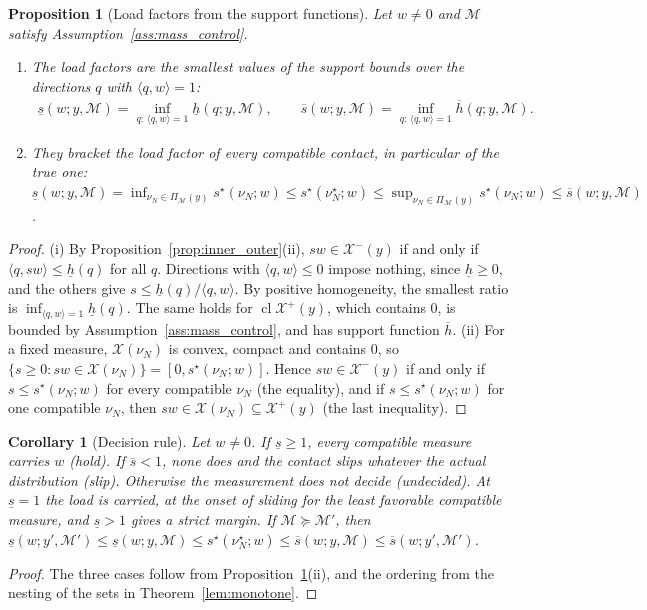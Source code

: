 \documentclass[11pt,a4paper]{article}
\theoremstyle{plain}
\newtheorem{proposition}[theorem]{Proposition}
\newtheorem{corollary}[theorem]{Corollary}
\newcommand{\X}{\mathcal X}
\begin{document}
\begin{proposition}[Load factors from the support functions]
\label{prop:load_factor}
    Let $w\neq0$ and $\mathcal M$ satisfy Assumption~\ref{ass:mass_control}.
    \begin{enumerate}[label=(\roman*)]
        \item The load factors are the smallest values of the support bounds over the directions $q$ with $\langle q,w\rangle=1$:
        \begin{align}
            \boxed{
            \underline s(w;y,\mathcal M)=\inf_{q:\,\langle q,w\rangle=1}\underline h(q;y,\mathcal M),
            \qquad
            \overline s(w;y,\mathcal M)=\inf_{q:\,\langle q,w\rangle=1}\overline h(q;y,\mathcal M).}
        \end{align}
        \item They bracket the load factor of every compatible contact, in particular of the true one:
        $\underline s(w;y,\mathcal M)=\inf_{\nu_N\in\Pi_{\mathcal M}(y)}s^\star(\nu_N;w)\le s^\star(\nu_N^\star;w)\le\sup_{\nu_N\in\Pi_{\mathcal M}(y)}s^\star(\nu_N;w)\le\overline s(w;y,\mathcal M)$.
    \end{enumerate}
\end{proposition}
\begin{proof}
    (i) By Proposition~\ref{prop:inner_outer}(ii), $sw\in\X^-(y)$ if and only if $\langle q,sw\rangle\le\underline h(q)$ for all $q$. Directions with $\langle q,w\rangle\le0$ impose nothing, since $\underline h\ge0$,
    and the others give $s\le\underline h(q)/\langle q,w\rangle$. By positive homogeneity, the smallest ratio is $\inf_{\langle q,w\rangle=1}\underline h(q)$. The same holds for $\operatorname{cl}\X^+(y)$,
    which contains $0$, is bounded by Assumption~\ref{ass:mass_control}, and has support function $\overline h$.
    (ii) For a fixed measure, $\X(\nu_N)$ is convex, compact and contains $0$, so $\{s\ge0:sw\in\X(\nu_N)\}=[0,s^\star(\nu_N;w)]$. Hence $sw\in\X^-(y)$ if and only if $s\le s^\star(\nu_N;w)$ for every compatible
    $\nu_N$ (the equality), and if $s\le s^\star(\nu_N;w)$ for one compatible $\nu_N$, then $sw\in\X(\nu_N)\subseteq\X^+(y)$ (the last inequality).
\end{proof}

\begin{corollary}[Decision rule]
\label{cor:load_factor_decision}
    Let $w\neq0$. If $\underline s\ge1$, every compatible measure carries $w$ (\textit{hold}). If $\overline s<1$, none does and the contact slips whatever the actual distribution (\textit{slip}).
    Otherwise the measurement does not decide (\textit{undecided}). At $\underline s=1$ the load is carried, at the onset of sliding for the least favorable compatible measure, and $\underline s>1$ gives a strict margin.
    If $\mathcal M\succeq\mathcal M'$, then $\underline s(w;y',\mathcal M')\le\underline s(w;y,\mathcal M)\le s^\star(\nu_N^\star;w)\le\overline s(w;y,\mathcal M)\le\overline s(w;y',\mathcal M')$.
\end{corollary}
\begin{proof}
    The three cases follow from Proposition~\ref{prop:load_factor}(ii), and the ordering from the nesting of the sets in Theorem~\ref{lem:monotone}.
\end{proof}
\end{document}
